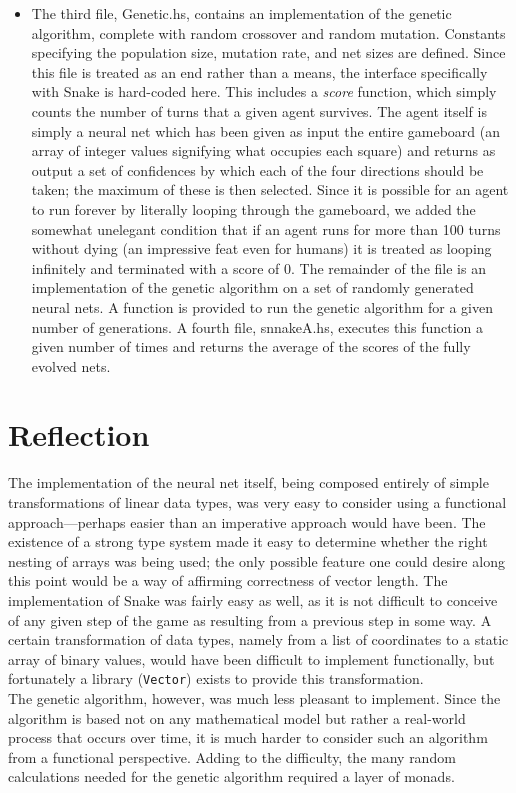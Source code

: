 \documentclass{sigplanconf}
\begin{document}
\begin{itemize}
 \item The third file, Genetic.hs, contains an implementation of the genetic algorithm, complete with random crossover and random mutation. Constants specifying the population size, mutation rate, and net sizes are defined. Since this file is treated as an end rather than a means, the interface specifically with Snake is hard-coded here. This includes a \textit{score} function, which simply counts the number of turns that a given agent survives. The agent itself is simply a neural net which has been given as input the entire gameboard (an array of integer values signifying what occupies each square) and returns as output a set of confidences by which each of the four directions should be taken; the maximum of these is then selected. Since it is possible for an agent to run forever by literally looping through the gameboard, we added the somewhat unelegant condition that if an agent runs for more than 100 turns without dying (an impressive feat even for humans) it is treated as looping infinitely and terminated with a score of 0. The remainder of the file is an implementation of the genetic algorithm on a set of randomly generated neural nets. A function is provided to run the genetic algorithm for a given number of generations. A fourth file, snnakeA.hs, executes this function a given number of times and returns the average of the scores of the fully evolved nets.
\end{itemize}

\section{Reflection}
The implementation of the neural net itself, being composed entirely of simple transformations of linear data types, was very easy to consider using a functional approach—perhaps easier than an imperative approach would have been. The existence of a strong type system made it easy to determine whether the right nesting of arrays was being used; the only possible feature one could desire along this point would be a way of affirming correctness of vector length. The implementation of Snake was fairly easy as well, as it is not difficult to conceive of any given step of the game as resulting from a previous step in some way. A certain transformation of data types, namely from a list of coordinates to a static array of binary values, would have been difficult to implement functionally, but fortunately a library (\texttt{Vector}) exists to provide this transformation. \\
The genetic algorithm, however, was much less pleasant to implement. Since the algorithm is based not on any mathematical model but rather a real-world process that occurs over time, it is much harder to consider such an algorithm from a functional perspective. Adding to the difficulty, the many random calculations needed for the genetic algorithm required a layer of monads.
\end{document}
